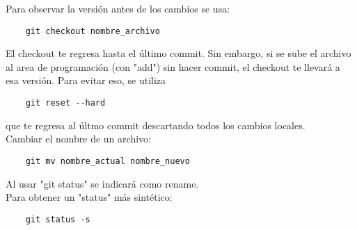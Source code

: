 \documentclass[10pt,oneside]{article}
\begin{document}
\begin{multicols}{2}
Para observar la versión antes de los cambios se usa: 
\begin{verbatim}
    git checkout nombre_archivo 
\end{verbatim}
El checkout te regresa hasta el último commit. Sin embargo, si se sube el archivo al area de programación (con "add") sin hacer commit, el checkout te llevará a esa versión. Para evitar eso, se utiliza \begin{verbatim}
    git reset --hard
\end{verbatim}
que te regresa al últmo commit descartando todos los cambios locales.\\\newline
Cambiar el nombre de un archivo:
\begin{verbatim}
    git mv nombre_actual nombre_nuevo
\end{verbatim}
Al usar "git status" se indicará como rename.\\ \newline Para obtener un "status" más sintético:
\begin{verbatim}
    git status -s
\end{verbatim}

\end{multicols}
\end{document}
